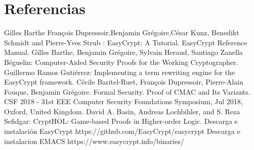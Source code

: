 \documentclass[runningheads,a4paper]{llncs}
\begin{document}
\section{Referencias}

\begin{thebibliography}{1}
Gilles Barthe François Dupressoir,Benjamin Grégoire,César Kunz, Benedikt Schmidt and Pierre-Yves Strub : EasyCrypt: A Tutorial. 
EasyCrypt Reference Manual.
Gilles Barthe, Benjamin Grégoire, Sylvain Heraud, Santiago Zanella Béguelin: Computer-Aided Security Proofs
for the Working Cryptographer.
Guillermo Ramos Gutiérrez: Implementing a term rewriting
engine for the EasyCrypt framework.
Cécile Baritel-Ruet, François Dupressoir, Pierre-Alain Fouque, Benjamin Grégoire. Formal Security.
Proof of CMAC and Its Variants. CSF 2018 - 31st EEE Computer Security Foundations Symposium,
Jul 2018, Oxford, United Kingdom.
David A. Basin, Andreas Lochbihler, and S. Reza Sefidgar: CryptHOL: Game-based Proofs in
Higher-order Logic.
Descarga e instalación EasyCrypt https://github.com/EasyCrypt/easycrypt
Descarga e instalacion EMACS https://www.easycrypt.info/binaries/ 
\end{thebibliography}
\end{document}

